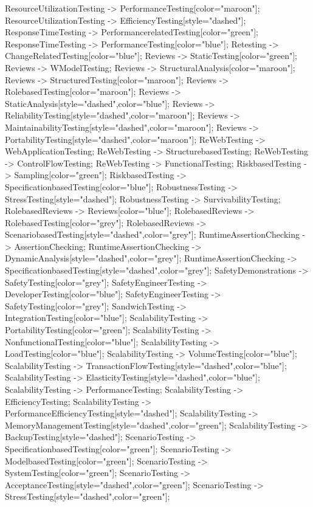\documentclass{article}
\begin{document}
{ResourceUtilizationTesting -> PerformanceTesting[color="maroon"];
ResourceUtilizationTesting -> EfficiencyTesting[style="dashed"];
ResponseTimeTesting -> PerformancerelatedTesting[color="green"];
ResponseTimeTesting -> PerformanceTesting[color="blue"];
Retesting -> ChangeRelatedTesting[color="blue"];
Reviews -> StaticTesting[color="green"];
Reviews -> WModelTesting;
Reviews -> StructuralAnalysis[color="maroon"];
Reviews -> StructuredTesting[color="maroon"];
Reviews -> RolebasedTesting[color="maroon"];
Reviews -> StaticAnalysis[style="dashed",color="blue"];
Reviews -> ReliabilityTesting[style="dashed",color="maroon"];
Reviews -> MaintainabilityTesting[style="dashed",color="maroon"];
Reviews -> PortabilityTesting[style="dashed",color="maroon"];
ReWebTesting -> WebApplicationTesting;
ReWebTesting -> StructurebasedTesting;
ReWebTesting -> ControlFlowTesting;
ReWebTesting -> FunctionalTesting;
RiskbasedTesting -> Sampling[color="green"];
RiskbasedTesting -> SpecificationbasedTesting[color="blue"];
RobustnessTesting -> StressTesting[style="dashed"];
RobustnessTesting -> SurvivabilityTesting;
RolebasedReviews -> Reviews[color="blue"];
RolebasedReviews -> RolebasedTesting[color="grey"];
RolebasedReviews -> ScenariobasedTesting[style="dashed",color="grey"];
RuntimeAssertionChecking -> AssertionChecking;
RuntimeAssertionChecking -> DynamicAnalysis[style="dashed",color="grey"];
RuntimeAssertionChecking -> SpecificationbasedTesting[style="dashed",color="grey"];
SafetyDemonstrations -> SafetyTesting[color="grey"];
SafetyEngineerTesting -> DeveloperTesting[color="blue"];
SafetyEngineerTesting -> SafetyTesting[color="grey"];
SandwichTesting -> IntegrationTesting[color="blue"];
ScalabilityTesting -> PortabilityTesting[color="green"];
ScalabilityTesting -> NonfunctionalTesting[color="blue"];
ScalabilityTesting -> LoadTesting[color="blue"];
ScalabilityTesting -> VolumeTesting[color="blue"];
ScalabilityTesting -> TransactionFlowTesting[style="dashed",color="blue"];
ScalabilityTesting -> ElasticityTesting[style="dashed",color="blue"];
ScalabilityTesting -> PerformanceTesting;
ScalabilityTesting -> EfficiencyTesting;
ScalabilityTesting -> PerformanceEfficiencyTesting[style="dashed"];
ScalabilityTesting -> MemoryManagementTesting[style="dashed",color="green"];
ScalabilityTesting -> BackupTesting[style="dashed"];
ScenarioTesting -> SpecificationbasedTesting[color="green"];
ScenarioTesting -> ModelbasedTesting[color="green"];
ScenarioTesting -> SystemTesting[color="green"];
ScenarioTesting -> AcceptanceTesting[style="dashed",color="green"];
ScenarioTesting -> StressTesting[style="dashed",color="green"];
}
\end{document}
